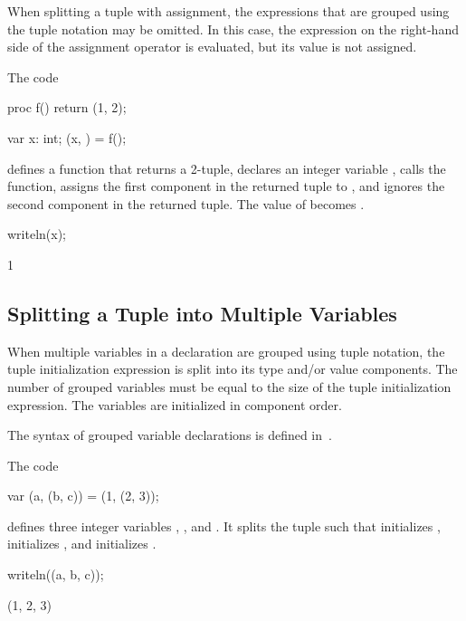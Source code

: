 When splitting a tuple with assignment, the expressions that are
grouped using the tuple notation may be omitted.  In this case, the
expression on the right-hand side of the assignment operator is
evaluated, but its value is not assigned.

\begin{example}
\begin{chapelpre}
\end{chapelpre}
The code
\begin{chapel}
proc f()
  return (1, 2);

var x: int;
(x, ) = f();
\end{chapel}
defines a function that returns a 2-tuple, declares an integer
variable , calls the function, assigns the first component in
the returned tuple to , and ignores the second component in
the returned tuple.  The value of  becomes .
\begin{chapelpost}
writeln(x);
\end{chapelpost}
\begin{chapeloutput}
1
\end{chapeloutput}
\end{example}

\subsection{Splitting a Tuple into Multiple Variables}
\label{Variable_Declarations_in_a_Tuple}

When multiple variables in a declaration are grouped using tuple
notation, the tuple initialization expression is
split into its type and/or value components.  The number of grouped variables must be
equal to the size of the tuple initialization
expression.  The variables are initialized in component order.

The syntax of grouped variable declarations is defined
in~.

\begin{example}
\begin{chapelpre}
\end{chapelpre}
The code
\begin{chapel}
var (a, (b, c)) = (1, (2, 3));
\end{chapel}
defines three integer variables , , and .  It
splits the tuple  such that 
initializes ,  initializes , and 
initializes .
\begin{chapelpost}
writeln((a, b, c));
\end{chapelpost}
\begin{chapeloutput}
(1, 2, 3)
\end{chapeloutput}
\end{example}

